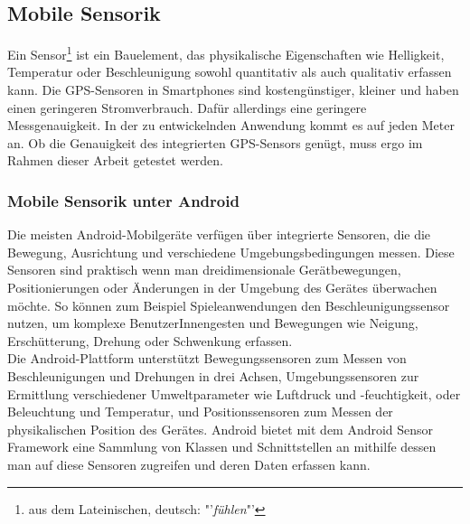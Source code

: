\subsection{Mobile Sensorik} 
Ein Sensor\footnote{ aus dem Lateinischen, deutsch: "'\textit{fühlen}"'} ist ein Bauelement, das physikalische Eigenschaften wie Helligkeit, Temperatur oder Beschleunigung sowohl quantitativ als auch qualitativ erfassen kann. Die \gls{GPS}-Sensoren in \glspl{Smartphone} sind kostengünstiger, kleiner und haben einen geringeren Stromverbrauch. Dafür allerdings eine geringere Messgenauigkeit. In der zu entwickelnden Anwendung kommt es auf jeden Meter an. Ob die Genauigkeit des integrierten \gls{GPS}-Sensors genügt, muss ergo im Rahmen dieser Arbeit getestet werden. 
\subsubsection{Mobile Sensorik unter Android}
Die meisten Android-Mobilgeräte verfügen über integrierte Sensoren, die die Bewegung, Ausrichtung und verschiedene Umgebungsbedingungen messen. Diese Sensoren sind praktisch wenn man dreidimensionale Gerätbewegungen, Positionierungen oder Änderungen in der Umgebung des Gerätes überwachen möchte. So können zum Beispiel Spieleanwendungen den Beschleunigungssensor nutzen, um komplexe BenutzerInnengesten und Bewegungen wie Neigung, Erschütterung, Drehung oder Schwenkung erfassen.\\
Die Android-Plattform unterstützt Bewegungssensoren zum Messen von Beschleunigungen und Drehungen in drei Achsen, Umgebungssensoren zur Ermittlung verschiedener Umweltparameter wie Luftdruck und -feuchtigkeit, oder Beleuchtung und Temperatur, und Positionssensoren zum Messen der physikalischen Position des Gerätes. Android bietet mit dem Android Sensor Framework eine Sammlung von Klassen und Schnittstellen an mithilfe dessen man auf diese Sensoren zugreifen und deren Daten erfassen kann. \cite{android_sensor}  
